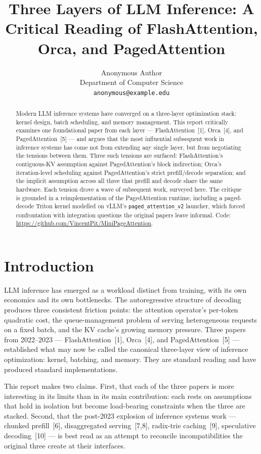 \documentclass{article}
\title{Three Layers of LLM Inference: A Critical Reading of FlashAttention, Orca, and PagedAttention}
\author{%
  Anonymous Author \\
  Department of Computer Science \\
  \texttt{anonymous@example.edu} \\
}
\begin{document}
\maketitle

\begin{abstract}
Modern LLM inference systems have converged on a three-layer optimization stack: kernel design, batch scheduling, and memory management. This report critically examines one foundational paper from each layer --- FlashAttention~[1], Orca~[4], and PagedAttention~[5] --- and argues that the most influential subsequent work in inference systems has come not from extending any single layer, but from negotiating the tensions between them. Three such tensions are surfaced: FlashAttention's contiguous-KV assumption against PagedAttention's block indirection; Orca's iteration-level scheduling against PagedAttention's strict prefill/decode separation; and the implicit assumption across all three that prefill and decode share the same hardware. Each tension drove a wave of subsequent work, surveyed here. The critique is grounded in a reimplementation of the PagedAttention runtime, including a paged-decode Triton kernel modelled on vLLM's \texttt{paged\_attention\_v2} launcher, which forced confrontation with integration questions the original papers leave informal. Code: \url{https://github.com/VincentPit/MiniPageAttention}.
\end{abstract}

\section{Introduction}

LLM inference has emerged as a workload distinct from training, with its own economics and its own bottlenecks. The autoregressive structure of decoding produces three consistent friction points: the attention operator's per-token quadratic cost, the queue-management problem of serving heterogeneous requests on a fixed batch, and the KV cache's growing memory pressure. Three papers from 2022--2023 --- FlashAttention~[1], Orca~[4], and PagedAttention~[5] --- established what may now be called the canonical three-layer view of inference optimization: kernel, batching, and memory. They are standard reading and have produced standard implementations.

This report makes two claims. First, that each of the three papers is more interesting in its limits than in its main contribution: each rests on assumptions that hold in isolation but become load-bearing constraints when the three are stacked. Second, that the post-2023 explosion of inference systems work --- chunked prefill~[6], disaggregated serving~[7,8], radix-trie caching~[9], speculative decoding~[10] --- is best read as an attempt to reconcile incompatibilities the original three create at their interfaces.
\end{document}
